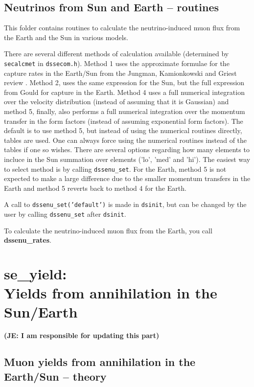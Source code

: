 \documentclass[a4paper,10pt,oneside]{book}
\newcommand{\joakim}[1]{{\color{red}\bf (JE: #1)}}
\newcommand{\codeb}[1]{\ftb{#1}}
\newcommand{\ftb}[1]{{\bfseries \sffamily #1}}
\begin{document}
\section{Neutrinos from Sun and Earth --  routines}

This folder contains routines to calculate the
neutrino-induced muon flux from the Earth and the Sun in various
models. 

There are several different methods of calculation available (determined
by \texttt{secalcmet} in \texttt{dssecom.h}). Method 1 uses the
approximate formulae for the capture rates in the Earth/Sun from the
Jungman, Kamionkowski and Griest review \cite{Jungman:1995df}. Method 2, uses the
same expression for the Sun, but the full expression from Gould
\cite{Gould:1987ir} for capture in the Earth. Method 4 uses a full numerical integration over the velocity distribution (instead of assuming that it is Gaussian) and method 5, finally, also performs a full numerical integration over the momentum transfer in the form factors (instead of assuming exponential form factors). The default is to use method 5, but instead of using the numerical routines directly, tables are used. One can always force using the numerical routines instead of the tables if one so wishes. There are several options regarding how many elements to incluce in the Sun summation over elements ('lo', 'med' and 'hi').
The easiest way to select method is by
calling \texttt{dssenu\_set}. For the Earth, method 5 is not expected to make a large difference due to the smaller momentum transfers in the Earth and method 5 reverts back to method 4 for the Earth.

A call to 
\texttt{dssenu\_set('default')} is made in \texttt{dsinit}, but can be
changed by the user by calling \texttt{dssenu\_set} after \texttt{dsinit}.

To calculate the neutrino-induced muon flux from the Earth, you call
\ftb{dssenu\_rates}. 

\chapter[se\_yield: Yields from annihilation in the Sun/Earth]{\codeb{se\_yield}:\\ Yields from annihilation in the Sun/Earth}
\label{ch:src/se_yield}

\joakim{I am responsible for updating this part}
\section{Muon yields from annihilation in the Earth/Sun -- theory}
\end{document}
